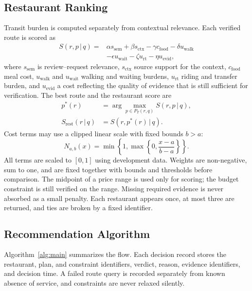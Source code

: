\documentclass[conference]{IEEEtran}
\begin{document}
\subsection{Restaurant Ranking}
Transit burden is computed separately from contextual relevance. Each verified route is scored as
\begin{equation}
\begin{aligned}
S(r,p\,|\,q)={}&\alpha s_{\mathrm{sem}}+\beta s_{\mathrm{ctx}}-\gamma c_{\mathrm{food}}-\delta u_{\mathrm{walk}}\\
&-\epsilon u_{\mathrm{wait}}-\zeta u_{\mathrm{rt}}-\eta u_{\mathrm{evid}},
\end{aligned}
\label{eq:score}
\end{equation}
where $s_{\mathrm{sem}}$ is review--request relevance, $s_{\mathrm{ctx}}$ source support for the context, $c_{\mathrm{food}}$ meal cost, $u_{\mathrm{walk}}$ and $u_{\mathrm{wait}}$ walking and waiting burdens, $u_{\mathrm{rt}}$ riding and transfer burden, and $u_{\mathrm{evid}}$ a cost reflecting the quality of evidence that is still sufficient for verification. The best route and the restaurant score are
\begin{equation}
\begin{aligned}
p^{*}(r)&=\arg\max_{p\in P_T(r,q)} S(r,p\,|\,q),\\
S_{\mathrm{rest}}(r\,|\,q)&=S(r,p^{*}(r)\,|\,q).
\end{aligned}
\label{eq:best}
\end{equation}
Cost terms may use a clipped linear scale with fixed bounds $b>a$:
\begin{equation}
N_{a,b}(x)=\min\left\{1,\max\left\{0,\frac{x-a}{b-a}\right\}\right\}.
\label{eq:norm}
\end{equation}
All terms are scaled to $[0,1]$ using development data. Weights are non-negative, sum to one, and are fixed together with bounds and thresholds before comparison. The midpoint of a price range is used only for scoring; the budget constraint is still verified on the range. Missing required evidence is never absorbed as a small penalty. Each restaurant appears once, at most three are returned, and ties are broken by a fixed identifier.

\subsection{Recommendation Algorithm}
Algorithm~\ref{alg:main} summarizes the flow. Each decision record stores the restaurant, plan, and constraint identifiers, verdict, reason, evidence identifiers, and decision time. A failed route query is recorded separately from known absence of service, and constraints are never relaxed silently.
\end{document}
